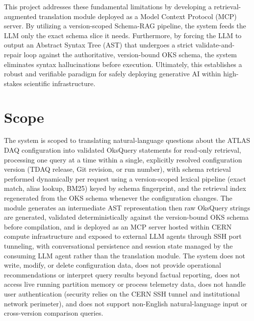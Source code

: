 \documentclass[12pt, a4paper]{report}
\begin{document}
This project addresses these fundamental limitations by developing a retrieval-augmented translation module deployed as a Model Context Protocol (MCP) server. By utilizing a version-scoped Schema-RAG pipeline, the system feeds the LLM only the exact schema slice it needs. Furthermore, by forcing the LLM to output an Abstract Syntax Tree (AST) that undergoes a strict validate-and-repair loop against the authoritative, version-bound OKS schema, the system eliminates syntax hallucinations before execution. Ultimately, this establishes a robust and verifiable paradigm for safely deploying generative AI within high-stakes scientific infrastructure.

\section{Scope}

The system is scoped to translating natural-language questions about the ATLAS DAQ configuration into validated OksQuery statements for read-only retrieval, processing one query at a time within a single, explicitly resolved configuration version (TDAQ release, Git revision, or run number), with schema retrieval performed dynamically per request using a version-scoped lexical pipeline (exact match, alias lookup, BM25) keyed by schema fingerprint, and the retrieval index regenerated from the OKS schema whenever the configuration changes. The module generates an intermediate AST representation then  raw OksQuery strings are generated, validated deterministically against the version-bound OKS schema before compilation, and is deployed as an MCP server hosted within CERN compute infrastructure and exposed to external LLM agents through SSH port tunneling, with conversational persistence and session state managed by the consuming LLM agent rather than the translation module. The system does not write, modify, or delete configuration data, does not provide operational recommendations or interpret query results beyond factual reporting, does not access live running partition memory or process telemetry data, does not handle user authentication (security relies on the CERN SSH tunnel and institutional network perimeter), and does not support non-English natural-language input or cross-version comparison queries.
\end{document}
